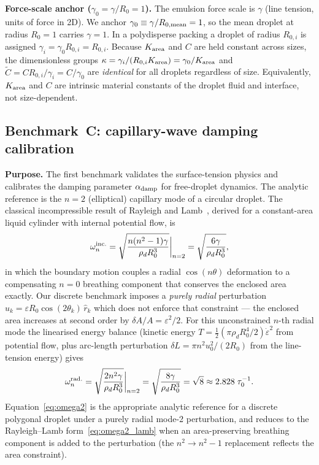 \documentclass[aps,pre,twocolumn,floatfix,longbibliography]{revtex4-2}
\begin{document}
\textbf{Force-scale anchor ($\gamma_0 = \gamma/R_0 = 1$).}
The emulsion force scale is $\gamma$ (line tension, units of force in 2D).  We
anchor $\gamma_0 \equiv \gamma/R_{0,\rm mean} = 1$, so the mean droplet at radius
$R_0 = 1$ carries $\gamma = 1$.  In a polydisperse packing a droplet of radius
$R_{0,i}$ is assigned $\gamma_i = \gamma_0 R_{0,i} = R_{0,i}$.  Because
$K_{\rm area}$ and $C$ are held constant across sizes, the dimensionless groups
$\kappa = \gamma_i/(R_{0,i} K_{\rm area}) = \gamma_0/K_{\rm area}$ and
$\tilde{C} = C R_{0,i}/\gamma_i = C/\gamma_0$ are \emph{identical} for all
droplets regardless of size.  Equivalently, $K_{\rm area}$ and $C$ are intrinsic
material constants of the droplet fluid and interface, not size-dependent.

\subsection{Benchmark~C: capillary-wave damping calibration}
\label{sec:emulsion_benchmarks_C}

\textbf{Purpose.}  The first benchmark validates the surface-tension physics and
calibrates the damping parameter $\alpha_{\rm damp}$ for free-droplet dynamics.  The
analytic reference is the $n = 2$ (elliptical) capillary mode of a circular droplet.
The classical incompressible result of Rayleigh and Lamb~\cite{Lamb1932}, derived for
a constant-area liquid cylinder with internal potential flow, is
\begin{equation}
  \omega_n^{\rm inc.} = \sqrt{\frac{n(n^2-1)\gamma}{\rho_d R_0^3}}\bigg|_{n=2}
           = \sqrt{\frac{6\gamma}{\rho_d R_0^3}},
  \label{eq:omega2_lamb}
\end{equation}
in which the boundary motion couples a radial $\cos(n\theta)$ deformation to a
compensating $n=0$ breathing component that conserves the enclosed area exactly.
Our discrete benchmark imposes a \emph{purely radial} perturbation
$u_k = \varepsilon R_0 \cos(2\theta_k)\,\hat{r}_k$ which does not enforce that
constraint --- the enclosed area increases at second order by
$\delta A/A = \varepsilon^2/2$.  For this unconstrained $n$-th radial mode the
linearised energy balance (kinetic energy
$T = \tfrac{1}{2}(\pi\rho_d R_0^4/2)\dot{\varepsilon}^2$ from potential flow,
plus arc-length perturbation
$\delta L = \pi n^2 u_0^2/(2R_0)$ from the line-tension energy) gives
\begin{equation}
  \omega_n^{\rm rad.} = \sqrt{\frac{2 n^2 \gamma}{\rho_d R_0^3}}\bigg|_{n=2}
           = \sqrt{\frac{8\gamma}{\rho_d R_0^3}}
           = \sqrt{8} \approx 2.828\;\tau_0^{-1}.
  \label{eq:omega2}
\end{equation}
Equation~\eqref{eq:omega2} is the appropriate analytic reference for a discrete
polygonal droplet under a purely radial mode-2 perturbation, and reduces to the
Rayleigh--Lamb form~\eqref{eq:omega2_lamb} when an area-preserving breathing
component is added to the perturbation
(the $n^2 \to n^2-1$ replacement reflects the area constraint).
\end{document}
